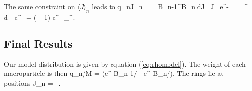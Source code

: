 The same constraint on $\langle J \rangle_n$ leads to
\Begineq
	q_{n}J_{n} = \int_{B_{n-1}}^{B_{n}} dJ \, J \,  e^{-} = \varepsilon \int_{}^{} d\xi \, \xi \, e^{-\xi} = \varepsilon (\xi + 1) e^{-\xi} \biggr\vert_{}^{}.
\Endeq

\subsection{Final Results}
Our model distribution is given by equation (\ref{eq:rhomodel}).  The weight of each macroparticle is then
\Begineq
	q_{n}/M = (e^{-B_{n-1}/\varepsilon} - e^{-B_{n}/\varepsilon}).
\Endeq
The rings lie at positions
\Begineq
	J_{n} = \varepsilon \, .
\Endeq

